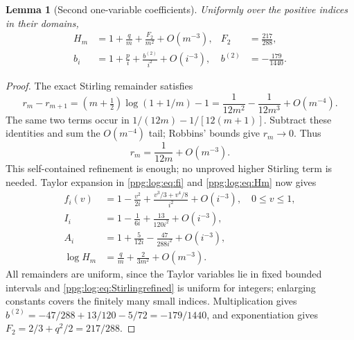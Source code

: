 \documentclass[11pt,letterpaper]{article}
\newtheorem{lemma}[theorem]{Lemma}
\theoremstyle{remark}\newtheorem{remark}[theorem]{Remark}
\numberwithin{equation}{section}
\begin{document}
\begin{lemma}[Second one-variable coefficients]\label{ppg:log:lem:secondfactors}
Uniformly over the positive indices in their domains,
\begin{align}
 H_m&=1+\frac q m+\frac{F_2}{m^2}+O(m^{-3}),& F_2&=\frac{217}{288},\label{ppg:log:eq:Hsecond}\\
 b_i&=1+\frac p i+\frac{b^{(2)}}{i^2}+O(i^{-3}),& b^{(2)}&=-\frac{179}{1440}.
 \label{ppg:log:eq:bsecond}
\end{align}
\end{lemma}
\begin{proof}
The exact Stirling remainder satisfies
\[
 r_m-r_{m+1}=(m+\tfrac12)\log(1+1/m)-1
 =\frac1{12m^2}-\frac1{12m^3}+O(m^{-4}).
\]
The same two terms occur in $1/(12m)-1/[12(m+1)]$. Subtract these identities and sum the $O(m^{-4})$ tail; Robbins' bounds give $r_m\to0$. Thus
\begin{equation}\label{ppg:log:eq:Stirlingrefined}
 r_m=\frac1{12m}+O(m^{-3}).
\end{equation}
This self-contained refinement is enough; no unproved higher Stirling term is needed. Taylor expansion in \eqref{ppg:log:eq:fi} and \eqref{ppg:log:eq:Hm} now gives
\begin{align*}
 f_i(v)&=1-\frac{v^2}{2i}+\frac{v^3/3+v^4/8}{i^2}+O(i^{-3}),\quad 0\le v\le1,\\
 I_i&=1-\frac1{6i}+\frac{13}{120i^2}+O(i^{-3}),\\
 A_i&=1+\frac5{12i}-\frac{47}{288i^2}+O(i^{-3}),\\
 \log H_m&=\frac q m+\frac2{3m^2}+O(m^{-3}).
\end{align*}
All remainders are uniform, since the Taylor variables lie in fixed bounded intervals and \eqref{ppg:log:eq:Stirlingrefined} is uniform for integers; enlarging constants covers the finitely many small indices. Multiplication gives $b^{(2)}=-47/288+13/120-5/72=-179/1440$, and exponentiation gives $F_2=2/3+q^2/2=217/288$.
\end{proof}
\end{document}
